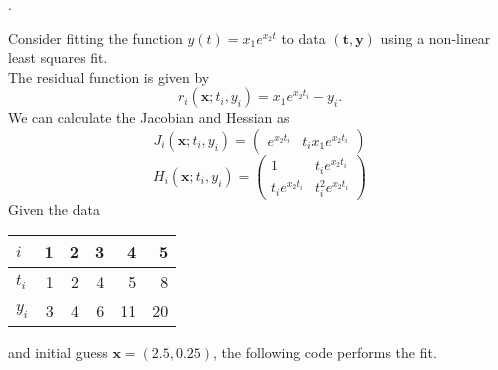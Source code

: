 \documentclass{spec}
\newcommand{\vx}{ {\bm x} } %
\begin{document}
\hslgeneral

.

\hslmethod 
\label{method}


\hslexample
Consider fitting the function $y(t) = x_1e^{x_2 t}$ to data $(\bm{t}, \bm{y})$
using a non-linear least squares fit.\\
The residual function is given by
$$
   r_i(\vx; t_i, y_i) = x_1 e^{x_2 t_i} - y_i.
$$
We can calculate the Jacobian and Hessian as
$$
   J_i(\vx; t_i, y_i) = \left(\begin{array}{cc}
      e^{x_2 t_i} &
      t_i x_1 e^{x_2 t_i}
      \end{array}\right)
$$
$$
   H_i(\vx; t_i, y_i) = \left(\begin{array}{cc}
      1                 & t_i e^{x_2 t_i}    \\
      t_i e^{x_2 t_i}   & t_i^2 e^{x_2 t_i}
   \end{array}\right)
$$
Given the data
\begin{center}
   \begin{tabular}{l|*{5}{r}}
      $i$   & 1 & 2 & 3  & 4  & 5 \\
      \hline
      $t_i$ & 1 & 2 & 4  & 5  & 8 \\
      $y_i$ & 3 & 4 & 6 & 11 & 20
   \end{tabular}
\end{center}
and initial guess $\vx = (2.5, 0.25)$, the following code performs the fit.


\end{document}
